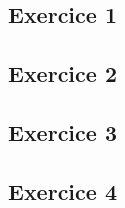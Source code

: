 

\subsection*{Exercice 1}

\subsection*{Exercice 2}

\subsection*{Exercice 3}

\subsection*{Exercice 4}

